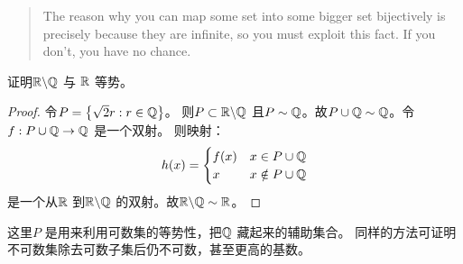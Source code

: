 \begin{quote}
    The reason why you can map some set into some bigger
    set bijectively is precisely because they are infinite,
    so you must exploit this fact. If you don't, you have no chance.
\end{quote}

\begin{problem}
    证明\(\mathbb{R}\backslash \mathbb{Q} \) 与 \(\mathbb{R}\) 等势。
\end{problem}

\begin{proof}
    令\(P=\left\{ \sqrt{2}r:r \in \mathbb{Q} \right\} \)。
    则\(P \subset \mathbb{R}\backslash \mathbb{Q}\) 且\(P\sim
    \mathbb{Q}\)。故\(P\cup \mathbb{Q}\sim \mathbb{Q}\)。令\(f: P\cup \mathbb{Q} \to \mathbb{Q}\) 是一个双射。
    则映射： \[
        h(x) =
        \begin{cases}
            f(x) & x\in P\cup \mathbb{Q} \\
            x & x \notin P\cup \mathbb{Q}
        \end{cases}
    \]
    是一个从\(\mathbb{R}\) 到\(\mathbb{R}\backslash \mathbb{Q}\) 的双射。故\(\mathbb{R}\backslash
    \mathbb{Q} \sim \mathbb{R}\)。
\end{proof}

这里\(P\) 是用来利用可数集的等势性，把\(\mathbb{Q}\) 藏起来的辅助集合。
同样的方法可证明不可数集除去可数子集后仍不可数，甚至更高的基数。







